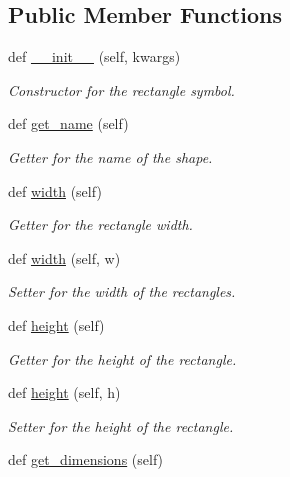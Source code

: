 \subsection*{Public Member Functions}
\begin{DoxyCompactItemize}
\item 
def \hyperlink{classbridges_1_1rectangle_1_1_rectangle_aad5cb2fdd1da2686fb67de2150f55d42}{\+\_\+\+\_\+init\+\_\+\+\_\+} (self, kwargs)
\begin{DoxyCompactList}\small\item\em Constructor for the rectangle symbol. \end{DoxyCompactList}\item 
def \hyperlink{classbridges_1_1rectangle_1_1_rectangle_aad74ee17feb376967249296d34dfcb74}{get\+\_\+name} (self)
\begin{DoxyCompactList}\small\item\em Getter for the name of the shape. \end{DoxyCompactList}\item 
def \hyperlink{classbridges_1_1rectangle_1_1_rectangle_a862f1154bb5e73c1811c38e7871f93a5}{width} (self)
\begin{DoxyCompactList}\small\item\em Getter for the rectangle width. \end{DoxyCompactList}\item 
def \hyperlink{classbridges_1_1rectangle_1_1_rectangle_a6b4b58e7312278fdc5d314bd574096bc}{width} (self, w)
\begin{DoxyCompactList}\small\item\em Setter for the width of the rectangles. \end{DoxyCompactList}\item 
def \hyperlink{classbridges_1_1rectangle_1_1_rectangle_a74a2af961f5eb512ccd5f7faded6645c}{height} (self)
\begin{DoxyCompactList}\small\item\em Getter for the height of the rectangle. \end{DoxyCompactList}\item 
def \hyperlink{classbridges_1_1rectangle_1_1_rectangle_ad150b377d0bc9f08c85f7f16643a6bf4}{height} (self, h)
\begin{DoxyCompactList}\small\item\em Setter for the height of the rectangle. \end{DoxyCompactList}\item 
def \hyperlink{classbridges_1_1rectangle_1_1_rectangle_a3f3823c7058ee639a92494276c2c9f22}{get\+\_\+dimensions} (self)

\end{DoxyCompactItemize}
